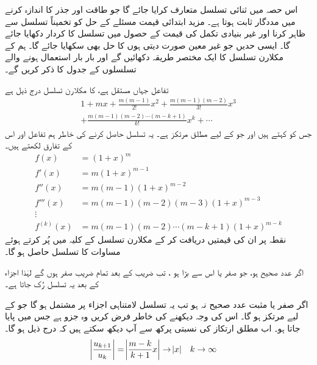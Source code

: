 


اس حصہ میں ثنائی تسلسل متعارف کرایا جائے گا جو طاقت اور جذر کا اندازہ  کرنے میں مددگار ثابت ہوتا ہے۔ مزید ابتدائی قیمت مسئلے کے حل کو تخمیناً تسلسل سے ظاہر کرنا اور غیر بنیادی تکمل کی قیمت کے حصول میں تسلسل کا کردار دکھایا جائے گا۔ ایسی  حدیں جو غیر معین صورت دیتی ہوں کا حل بھی سکھایا جائے گا۔  ہم  کے مکلارن تسلسل کا ایک مختصر طریقہ دکھائیں گے اور بار بار استعمال ہونے والے تسلسلوں کے جدول کا ذکر کریں گے۔

تفاعل  جہاں  مستقل ہے، کا مکلارن تسلسل درج ذیل ہے
\begin{multline}\label{مساوات_تسلسل_ثنائی_الف}
1+mx+\frac{m(m-1)}{2!}x^2+\frac{m(m-1)(m-2)}{3!}x^3\\
+\frac{m(m-1)(m-2)\cdots (m-k+1)}{k!}x^k+\cdots
\end{multline}
جس کو  کہتے ہیں اور جو  کے لیے مطلق مرتکز ہے۔ یہ تسلسل حاصل کرنے کی خاطر ہم تفاعل اور اس کے تفارق لکھتے ہیں۔
\begin{align*}
f(x)&=(1+x)^m\\
f'(x)&=m(1+x)^{m-1}\\
f''(x)&=m(m-1)(1+x)^{m-2}\\
f'''(x)&=m(m-1)(m-2)(m-3)(1+x)^{m-3}\\
\vdots\\
f^{(k)}(x)&=m(m-1)(m-2)\cdots(m-k+1)(1+x)^{m-k}
\end{align*}
نقطہ   پر ان کی قیمتیں دریافت کر کے مکلارن تسلسل کے کلیہ میں پُر کرتے ہوئے مساوات  کا تسلسل حاصل ہو گا۔

اگر  عدد صحیح ہو،  جو صفر یا اس سے بڑا ہو ، تب   ضریب  کے بعد  تمام  ضریب  صفر ہوں گے لہٰذا  اجزاء کے بعد یہ تسلسل رُک جاتا ہے۔

اگر  صفر یا مثبت عدد صحیح نہ ہو تب یہ تسلسل لامتناہی اجزاء پر مشتمل ہو گا جو  کے لیے مرتکز ہو گا۔ اس کی وجہ دیکھنے کی خاطر فرض کریں  وہ جزو ہے جس میں   پایا جاتا ہو۔ اب مطلق ارتکاز کی نسبتی پرکھ سے آپ دیکھ سکتے ہیں کہ درج ذیل ہو گا۔ 
\begin{align*}
\abs{\frac{u_{k+1}}{u_k}}&=\abs{\frac{m-k}{k+1}x}\to \abs{x}&&k\to \infty
\end{align*}

